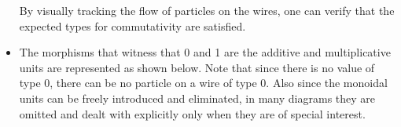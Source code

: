 \documentclass{llncs}
\begin{document}
\begin{itemize}
By visually tracking the flow of particles on the wires, one can
verify that the expected types for commutativity are satisfied.


\item The morphisms that witness that {{0}} and {{1}} are the additive and
  multiplicative units are represented as shown below. Note that since there
  is no value of type 0, there can be no particle on a wire of type {{0}}.
  Also since the monoidal units can be freely introduced and eliminated, in
  many diagrams they are omitted and dealt with explicitly only when they are
  of special interest.
\begin{multicols}{4}
\begin{center}
\end{center}
\begin{center}
\end{center}  
\begin{center}
\end{center}
\columnbreak
\begin{center}
\end{center}
\end{multicols}


\end{itemize}
\end{document}
